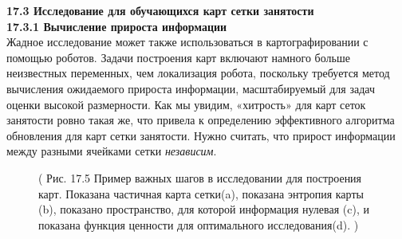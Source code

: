 \documentclass[10pt,a4paper]{article}
\begin{document}
\textbf{17.3	Исследование для обучающихся карт сетки занятости}\\

\textbf{17.3.1	Вычисление прироста информации}\\

Жадное исследование может также использоваться в картографировании с помощью роботов. Задачи построения карт включают намного больше неизвестных переменных, чем локализация робота, поскольку требуется метод вычисления ожидаемого прироста информации, масштабируемый для задач оценки высокой размерности. Как мы увидим, «хитрость» для карт сеток занятости ровно такая же, что привела к определению эффективного алгоритма обновления для карт сетки занятости. Нужно считать, что прирост информации между разными ячейками сетки \textit{независим}.

\begin{figure}[H]
	\caption{ ( Рис. 17.5 Пример важных шагов в исследовании для построения карт. Показана частичная карта сетки(a), показана энтропия карты (b),  показано пространство, для которой информация нулевая (c), и показана функция ценности для оптимального исследования(d). ) }
	\label{fig:175orig}
\end{figure}
\end{document}

